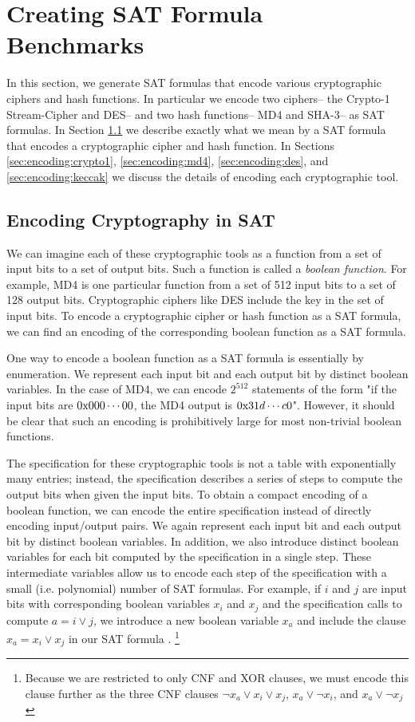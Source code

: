 \section{Creating SAT Formula Benchmarks}
\label{sec:encoding}

In this section, we generate SAT formulas that encode various cryptographic ciphers and hash functions. In particular we encode two ciphers-- the Crypto-1 Stream-Cipher and DES-- and two hash functions-- MD4 and SHA-3-- as SAT formulas. In Section \ref{sec:encoding:desc} we describe exactly what we mean by a SAT formula that encodes a cryptographic cipher and hash function. In Sections \ref{sec:encoding:crypto1}, \ref{sec:encoding:md4}, \ref{sec:encoding:des}, and \ref{sec:encoding:keccak} we discuss the details of encoding each cryptographic tool.

\subsection{Encoding Cryptography in SAT}
\label{sec:encoding:desc}
We can imagine each of these cryptographic tools as a function from a set of input bits to a set of output 
bits. Such a function is called a \emph{boolean function}. For example, MD4 is one particular function from a set of 512 input bits to a set of 128 output bits. Cryptographic ciphers like DES include the key in the set of input bits. To encode a cryptographic cipher or hash function as a SAT formula, we can find an encoding of the corresponding boolean function as a SAT formula.

One way to encode a boolean function as a SAT formula is essentially by enumeration. We represent each input bit and each output bit by distinct boolean variables. In the case of MD4, we can encode $2^{512}$ statements of the form "if the input bits are $0\text{x}000 \cdots 00$, the MD4 output is $0\text{x}31d \cdots c0$". However, it should be clear that such an encoding is prohibitively large for most non-trivial boolean functions.

The specification for these cryptographic tools is not a table with exponentially many entries; instead, the specification describes a series of steps to compute the output bits when given the input bits. To obtain a compact encoding of a boolean function, we can encode the entire specification instead of directly encoding input/output pairs. We again represent each input bit and each output bit by distinct boolean variables. In addition, we also introduce distinct boolean variables for each bit computed by the specification in a single step. These intermediate variables allow us to encode each step of the specification with a small (i.e. polynomial) number of SAT formulas. For example, if $i$ and $j$ are input bits with corresponding boolean variables $x_i$ and $x_j$ and the specification calls to compute $a = i \lor j$, we introduce a new boolean variable $x_a$ and include the clause $x_a = x_i \lor x_j$ in our SAT formula . \footnote{Because we are restricted to only CNF and XOR clauses, we must encode this clause further as the three CNF clauses $\neg x_a \lor x_i \lor x_j$, $x_a \lor \neg x_i$, and $x_a \lor \neg x_j$}

